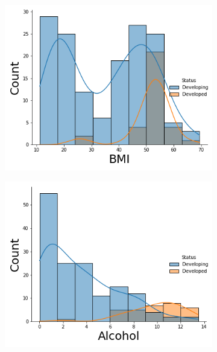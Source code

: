 \begin{itemize}
          \begin{figure}[H]
            \centering
              \begin{subfigure}{0.2\linewidth}
                \centering
                \includegraphics[width=\textwidth]{img/23.png}
              \end{subfigure}
              \hfill
                \begin{subfigure}{0.2\linewidth}
                \centering
                \includegraphics[width=\textwidth]{img/24.png}
              \end{subfigure}
              \hfill
                \begin{subfigure}{0.2\linewidth}

\end{subfigure}
\end{figure}
\end{itemize}
